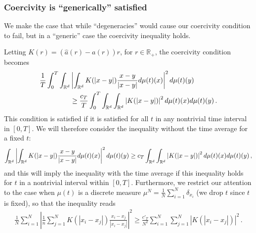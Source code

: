 \subsubsection{Coercivity is ``generically'' satisfied}
We make the case that while ``degeneracies'' would cause our coercivity condition to fail, but in a ``generic'' case the coercivity inequality holds.

Letting $K(r)=(\widehat a(r)-a(r))r$, for $r\in\mathbb{R}_+$, the coercivity condition becomes
\begin{align*}
\frac1T\int_0^T\int_{\mathbb{R}^d}&\left|\int_{\mathbb{R}^d} K(|x-y|)\frac{x-y}{|x-y|}d\mu(t)(x)\right|^2d\mu(t)(y) \\
&\ge\frac{c_T}{T}\int_0^T\int_{\mathbb{R}^d}\int_{\mathbb{R}^d}\left|K(|x-y|)\right|^2d\mu(t)(x)d\mu(t)(y)\,.
\end{align*}
This condition is satisfied if it is satisfied for all $t$ in any nontrivial time interval in $[0,T]$. We will therefore consider the inequality without the time average for a fixed $t$:
\begin{align*}
\int_{\mathbb{R}^d}\left|\int_{\mathbb{R}^d} K(|x-y|)\frac{x-y}{|x-y|}d\mu(t)(x)\right|^2d\mu(t)(y)
\ge c_T\int_{\mathbb{R}^d}\int_{\mathbb{R}^d}\left|K(|x-y|)\right|^2d\mu(t)(x)d\mu(t)(y)\,,
\end{align*}
and this will imply the inequality with the time average if this inequality holds for $t$ in a nontrivial interval within $[0,T]$.
Furthermore, we restrict our attention to the case when $\mu(t)$ is a discrete measure $\mu^N=\frac1N\sum_{i=1}^N\delta_{x_i}$ (we drop $t$ since $t$ is fixed), so that the inequality reads
\begin{align}
\frac1N\sum_{i=1}^N\left|\frac1n\sum_{j=1}^N K(|x_i-x_j|)\frac{x_i-x_j}{|x_i-x_j|}\right|^2\ge \frac{c'_T}{N^2}\sum_{i=1}^N\sum_{j=1}^N\left|K(|x_i-x_j|)\right|^2\,.
\label{e:coercivitydiscrete}
\end{align}

